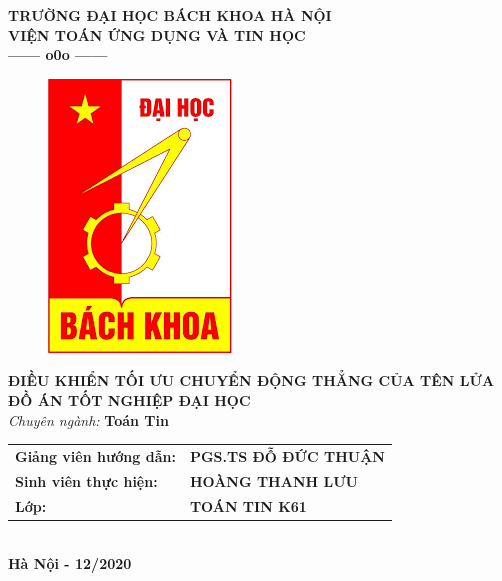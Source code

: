 \documentclass[12pt,a4paper]{report}
\begin{document}
	\thisfancypage{%
		\setlength{\fboxsep}{0pt}%
		\fbox}{} %
	\thispagestyle{empty}
	\begin{center}
		\vspace*{0cm}
		\fontsize{14}{12}
		\textbf{TRƯỜNG ĐẠI HỌC BÁCH KHOA HÀ NỘI}\\
		\textbf{VIỆN TOÁN ỨNG DỤNG VÀ TIN HỌC}\\
		\textbf{------ o0o ------}
	\end{center}
	\vspace*{0.4cm}
	\begin{figure}[h]
		\centering
		\includegraphics[scale=.55]{./image/logo.png}
	\end{figure}
	\vspace*{0.4cm}
	\begin{center}
		\fontsize{20}{18}
		\textbf{ĐIỀU KHIỂN TỐI ƯU CHUYỂN ĐỘNG THẲNG CỦA TÊN LỬA}\\
		\vspace*{1.2cm}
		\fontsize{18}{16}
		\textbf{ĐỒ ÁN TỐT NGHIỆP ĐẠI HỌC}\\
		\fontsize{14}{16}
		\vspace*{0.4cm}
		\textit{Chuyên ngành:} \textbf{Toán Tin}
	\end{center}
	\vspace*{0.7cm}
	\begin{center}
		\fontsize{14}{16}
		\begin{tabular}{ll}
			
			\textbf{Giảng viên hướng dẫn:} & \textbf{PGS.TS ĐỖ ĐỨC THUẬN } \\ 
			\textbf{Sinh viên thực hiện:} & \textbf{HOÀNG THANH LƯU} \\ 
			\textbf{Lớp:}  & \textbf{TOÁN TIN K61} \\ 
		\end{tabular} \\
		\vspace*{1.6cm}
		\fontsize{14}{16}
		\textbf{Hà Nội - 12/2020}
	\end{center}
	\newpage
	\thispagestyle{empty}
	
\end{document}
